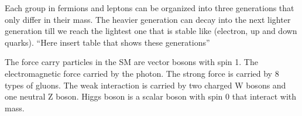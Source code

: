 Each group in fermions and leptons can be organized into three generations that only differ in their mass. The heavier generation can decay into the next lighter generation till we reach the lightest one that is stable like (electron, up and  down quarks). “Here insert table that shows these generations”

The force carry particles in the SM are vector bosons with spin 1. The electromagnetic force carried by the photon. The strong force is carried by 8 types of gluons. The weak interaction is carried by two charged W bosons and one neutral Z boson. Higgs boson is a scalar boson with spin 0 that interact with mass.

